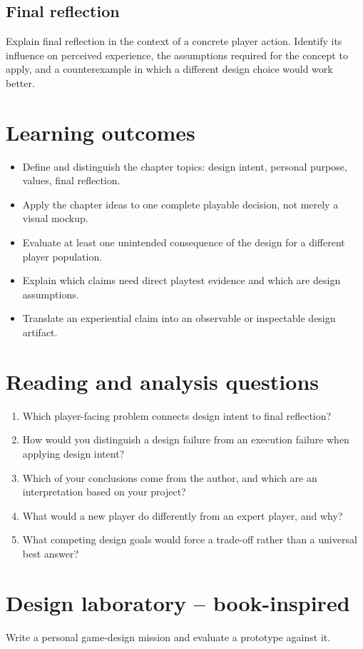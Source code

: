\documentclass[11pt]{article}
\begin{document}
\subsection{Final reflection}
Explain final reflection in the context of a concrete player action. Identify its influence on perceived experience, the assumptions required for the concept to apply, and a counterexample in which a different design choice would work better.


\section{Learning outcomes}
\begin{itemize}
\item Define and distinguish the chapter topics: design intent, personal purpose, values, final reflection.
\item Apply the chapter ideas to one complete playable decision, not merely a visual mockup.
\item Evaluate at least one unintended consequence of the design for a different player population.
\item Explain which claims need direct playtest evidence and which are design assumptions.
\item Translate an experiential claim into an observable or inspectable design artifact.
\end{itemize}

\section{Reading and analysis questions}
\begin{enumerate}
\item Which player-facing problem connects design intent to final reflection?
\item How would you distinguish a design failure from an execution failure when applying design intent?
\item Which of your conclusions come from the author, and which are an interpretation based on your project?
\item What would a new player do differently from an expert player, and why?
\item What competing design goals would force a trade-off rather than a universal best answer?
\end{enumerate}

\section{Design laboratory -- book-inspired}
Write a personal game-design mission and evaluate a prototype against it.
\end{document}
